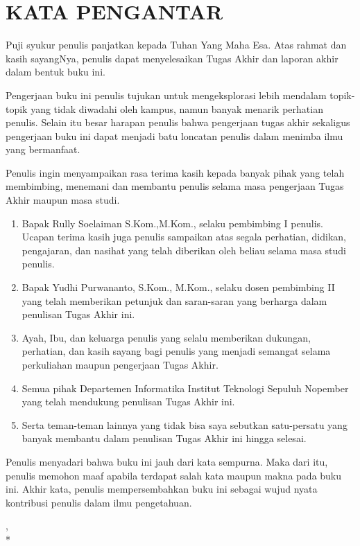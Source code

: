 \chapter {KATA PENGANTAR}

Puji syukur penulis panjatkan kepada Tuhan Yang Maha Esa. Atas rahmat dan kasih sayangNya, penulis dapat menyelesaikan Tugas Akhir dan laporan akhir dalam bentuk buku ini.

Pengerjaan buku ini penulis tujukan untuk mengeksplorasi lebih mendalam topik-topik yang tidak diwadahi oleh kampus, namun banyak menarik perhatian penulis. Selain itu besar harapan penulis bahwa pengerjaan tugas akhir sekaligus pengerjaan buku ini dapat menjadi batu loncatan penulis dalam menimba ilmu yang bermanfaat.

Penulis ingin menyampaikan rasa terima kasih kepada banyak pihak yang telah membimbing, menemani dan membantu penulis selama masa pengerjaan Tugas Akhir maupun masa studi.

\begin {enumerate}
	\item Bapak Rully Soelaiman S.Kom.,M.Kom., selaku pembimbing I penulis. Ucapan terima kasih juga penulis sampaikan atas segala perhatian, didikan, pengajaran, dan nasihat yang telah diberikan oleh beliau selama masa studi penulis.
	\item Bapak Yudhi Purwananto, S.Kom., M.Kom., selaku dosen pembimbing II yang telah memberikan petunjuk dan saran-saran yang berharga dalam penulisan Tugas Akhir ini.
	\item Ayah, Ibu, dan keluarga penulis yang selalu memberikan dukungan, perhatian, dan kasih sayang bagi penulis yang menjadi semangat selama perkuliahan maupun pengerjaan Tugas Akhir.
	\item Semua pihak Departemen Informatika Institut Teknologi Sepuluh Nopember yang telah mendukung penulisan Tugas Akhir ini.
	\item Serta teman-teman lainnya yang tidak bisa saya sebutkan satu-persatu yang banyak membantu dalam penulisan Tugas Akhir ini hingga selesai.
\end {enumerate}

Penulis menyadari bahwa buku ini jauh dari kata sempurna. Maka dari itu, penulis memohon maaf apabila terdapat salah kata maupun makna pada buku ini. Akhir kata, penulis mempersembahkan buku ini sebagai wujud nyata kontribusi penulis dalam ilmu pengetahuan.

\begin{flushright}
\lokasi, \tanggal \\*
\vspace{5em}
\penulis
\end{flushright}